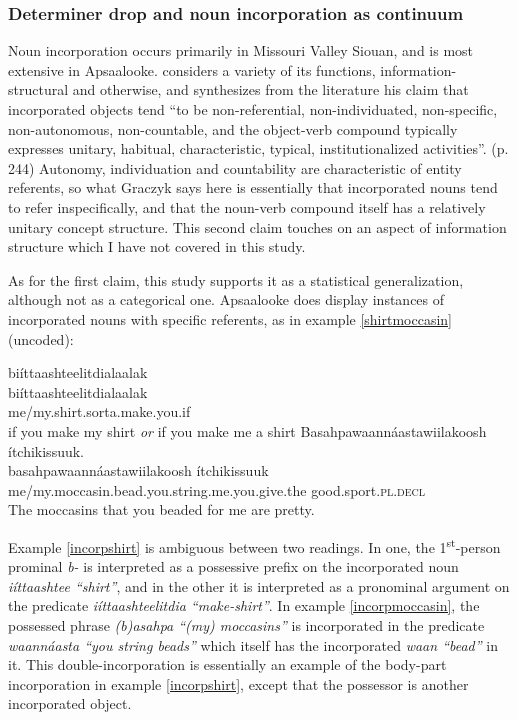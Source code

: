 \documentclass[output=paper]{LSP/langsci}
\begin{document}
\subsubsection{Determiner drop and noun incorporation as continuum}\label{dropincorp}

Noun incorporation occurs primarily in Missouri Valley Siouan, and is most extensive in Apsaalooke. \citet{Graczyk1991} considers a variety of its functions, information-structural and otherwise, and synthesizes from the literature his claim that incorporated objects tend “to be non-referential, non-individuated, non-specific, non-autonomous, non-countable, and the object-verb compound typically expresses unitary, habitual, characteristic, typical, institutionalized activities”. (p. 244) Autonomy, individuation and countability are characteristic of entity referents, so what Graczyk says here is essentially that incorporated nouns tend to refer inspecifically, and that the noun-verb compound itself has a relatively unitary concept structure. This second claim touches on an aspect of information structure which I have not covered in this study.

As for the first claim, this study supports it as a statistical generalization, although not as a categorical one. Apsaalooke does display instances of incorporated nouns with specific referents, as in example \ref{shirtmoccasin} (uncoded):

\ea\label{shirtmoccasin}
\ea\label{incorpshirt}
biíttaashteelitdialaalak\footnotemark\\
\gll	biíttaashteelitdialaalak\\
	me/my.shirt.sorta.make.you.if\\
\glt	if you make my shirt \emph{or} if you make me a shirt
\ex\label{incorpmoccasin}
Basahpawaannáastawiilakoosh ítchikissuuk.\footnotemark\\
\gll	basahpawaannáastawiilakoosh					ítchikissuuk\\
	me/my.moccasin.bead.you.string.me.you.give.the 		good.sport.\textsc{pl.decl}\\
\glt	The moccasins that you beaded for me are pretty. 
\z\z

Example \ref{incorpshirt} is ambiguous between two readings. In one, the 1\textsuperscript{st}-person prominal \emph{b-} is interpreted as a possessive prefix on the incorporated noun  \emph{iíttaashtee “shirt”}, and in the other it is interpreted as a pronominal argument on the predicate \emph{iíttaashteelitdia “make-shirt”}. In example \ref{incorpmoccasin}, the possessed phrase \emph{(b)asahpa “(my) moccasins”} is incorporated in the predicate \emph{waannáasta “you string beads”} which itself has the incorporated \emph{waan “bead”} in it. This double-incorporation is essentially an example of the body-part incorporation in example \ref{incorpshirt}, except that the possessor is another incorporated object.
\end{document}
